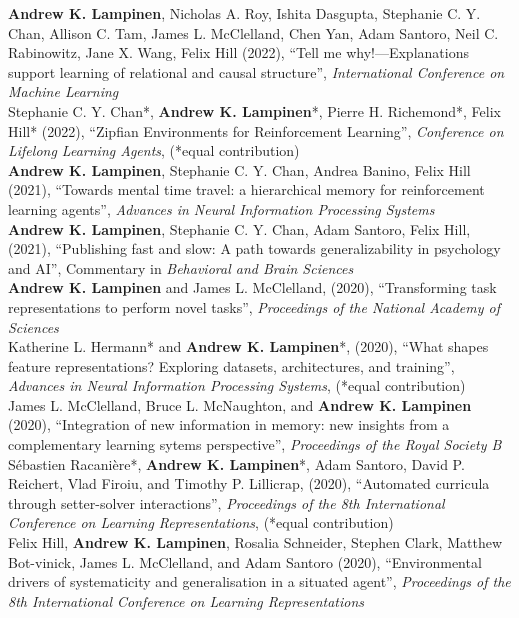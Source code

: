 \documentclass[margin]{res}
\begin{document}
\begin{resume}
\textbf{Andrew K. Lampinen}, Nicholas A. Roy, Ishita Dasgupta, Stephanie C. Y. Chan, Allison C. Tam, James L. McClelland, Chen Yan, Adam Santoro, Neil C. Rabinowitz, Jane X. Wang, Felix Hill (2022), {``Tell me why!---Explanations support learning of relational and causal structure'',} \textit{International Conference on Machine Learning} \\[3pt] 
Stephanie C. Y. Chan*, \textbf{Andrew K. Lampinen}*, Pierre H. Richemond*, Felix Hill* (2022), {``Zipfian Environments for Reinforcement Learning'',} \textit{Conference on Lifelong Learning Agents}, (*equal contribution) \\[3pt] 
\textbf{Andrew K. Lampinen}, Stephanie C. Y. Chan, Andrea Banino, Felix Hill (2021), {``Towards mental time travel: a hierarchical memory for reinforcement learning agents'',} \textit{Advances in Neural Information Processing Systems} \\[3pt] 
\textbf{Andrew K. Lampinen}, Stephanie C. Y. Chan, Adam Santoro, Felix Hill, (2021), {``Publishing fast and slow: A path towards generalizability in psychology and AI'',} Commentary in \textit{Behavioral and Brain Sciences} \\[3pt] 
\textbf{Andrew K. Lampinen} and James L. McClelland, (2020), {``Transforming task representations to perform novel tasks'',} \textit{Proceedings of the National Academy of Sciences} \\[3pt] 
Katherine L. Hermann* and \textbf{Andrew K. Lampinen}*, (2020), {``What shapes feature representations? Exploring datasets, architectures, and training'',} \textit{Advances in Neural Information Processing Systems}, (*equal contribution) \\[3pt] 
James L. McClelland, Bruce L. McNaughton, and \textbf{Andrew K. Lampinen} (2020), {``Integration of new information in memory: new insights from a complementary learning sytems perspective''}, \textit{Proceedings of the Royal Society B} \\[3pt]
S\'ebastien Racani\`ere*, \textbf{Andrew K. Lampinen}*, Adam Santoro, David P. Reichert, Vlad Firoiu, and Timothy P. Lillicrap, (2020), {``Automated curricula through setter-solver interactions'',} \textit{Proceedings of the 8th International Conference on Learning Representations}, (*equal contribution) \\ [3pt] 
Felix Hill, \textbf{Andrew K. Lampinen}, Rosalia Schneider, Stephen Clark, Matthew Bot-vinick, James L. McClelland, and Adam Santoro (2020), {``Environmental drivers of systematicity and generalisation in a situated agent'',} \textit{Proceedings of the 8th International Conference on Learning Representations} \\ [3pt] 

\end{resume}
\end{document}
